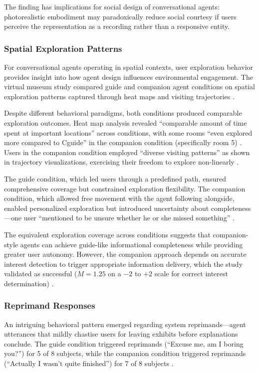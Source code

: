 \documentclass[manuscript,anonymous,sigconf]{acmart}
\begin{document}
The finding has implications for social design of conversational agents: photorealistic embodiment may paradoxically reduce social courtesy if users perceive the representation as a recording rather than a responsive entity.

\subsubsection{Spatial Exploration Patterns}

For conversational agents operating in spatial contexts, user exploration behavior provides insight into how agent design influences environmental engagement. The virtual museum study compared guide and companion agent conditions on spatial exploration patterns captured through heat maps and visiting trajectories \cite{A82}.

Despite different behavioral paradigms, both conditions produced comparable exploration outcomes. Heat map analysis revealed ``comparable amount of time spent at important locations'' across conditions, with some rooms ``even explored more compared to Cguide'' in the companion condition (specifically room 5) \cite{A82}. Users in the companion condition employed ``diverse visiting patterns'' as shown in trajectory visualizations, exercising their freedom to explore non-linearly \cite{A82}.

The guide condition, which led users through a predefined path, ensured comprehensive coverage but constrained exploration flexibility. The companion condition, which allowed free movement with the agent following alongside, enabled personalized exploration but introduced uncertainty about completeness---one user ``mentioned to be unsure whether he or she missed something'' \cite{A82}.

The equivalent exploration coverage across conditions suggests that companion-style agents can achieve guide-like informational completeness while providing greater user autonomy. However, the companion approach depends on accurate interest detection to trigger appropriate information delivery, which the study validated as successful ($M = 1.25$ on a $-2$ to $+2$ scale for correct interest determination) \cite{A82}.

\subsubsection{Reprimand Responses}

An intriguing behavioral pattern emerged regarding system reprimands---agent utterances that mildly chastise users for leaving exhibits before explanations conclude. The guide condition triggered reprimands (``Excuse me, am I boring you?'') for 5 of 8 subjects, while the companion condition triggered reprimands (``Actually I wasn't quite finished'') for 7 of 8 subjects \cite{A82}.
\end{document}
